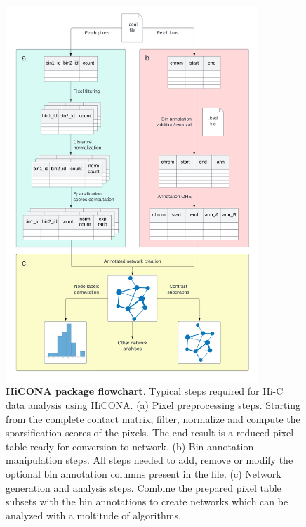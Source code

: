 \begin{figure}
  \centering
  \includegraphics[width=0.85\textwidth]{package_flowchart.png}
  \caption{\textbf{HiCONA package flowchart}. Typical steps required for Hi-C data analysis using HiCONA. (a) Pixel preprocessing steps. Starting from the complete contact matrix, filter, normalize and compute the sparsification scores of the pixels. The end result is a reduced pixel table ready for conversion to network. (b) Bin annotation manipulation steps. All steps needed to add, remove or modify the optional bin annotation columns present in the file. (c) Network generation and analysis steps. Combine the prepared pixel table subsets with the bin annotations to create networks which can be analyzed with a moltitude of algorithms.}
  \label{fig:flowchart}
\end{figure}

